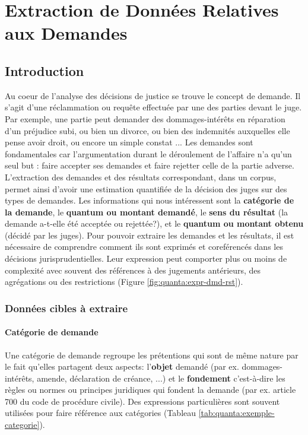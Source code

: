 %
\chapter{Extraction de Données Relatives aux Demandes}
\label{sec:quanta}

\section{Introduction}
\label{sec:quanta:introduction}
Au coeur de l'analyse des décisions de justice se trouve le concept de demande. Il s'agit d'une réclammation ou requête effectuée par une des parties devant le juge. Par exemple, une partie peut demander des dommages-intérêts en réparation d'un préjudice subi, ou bien un divorce, ou bien des indemnités auxquelles elle pense avoir droit, ou encore un simple constat ... Les demandes sont fondamentales car l'argumentation durant le déroulement de l'affaire n'a qu'un seul but : faire accepter ses demandes et faire rejetter celle de la partie adverse. L'extraction des demandes et des résultats correspondant, dans un corpus, permet ainsi d'avoir une estimation quantifiée de la décision des juges sur des types de demandes. Les informations qui nous intéressent sont la \textbf{catégorie de la demande}, le \textbf{quantum ou montant demandé}, le \textbf{sens du résultat} (la demande a-t-elle été acceptée ou rejettée?), et le \textbf{quantum ou montant obtenu} (décidé par les juges). Pour pouvoir extraire les demandes et les résultats, il est nécessaire de comprendre comment ils sont exprimés et coreférencés dans les décisions jurisprudentielles. Leur expression peut comporter plus ou moins de complexité avec souvent des références à des jugements antérieurs, des agrégations ou des restrictions (Figure \ref{fig:quanta:expr-dmd-rst}).

\subsection{Données cibles à extraire}
\subsubsection{Catégorie de demande}
Une catégorie de demande regroupe les prétentions qui sont de même nature par le fait qu'elles partagent deux aspects: l'\textbf{objet} demandé (par ex. dommages-intérêts, amende, déclaration de créance, ...) et le \textbf{fondement} c'est-à-dire les règles ou normes ou principes juridiques qui fondent la demande (par ex. article 700 du code de procédure civile). Des expressions particulières sont souvent utilisées pour faire référence aux catégories (Tableau \ref{tab:quanta:exemple-categorie}).

